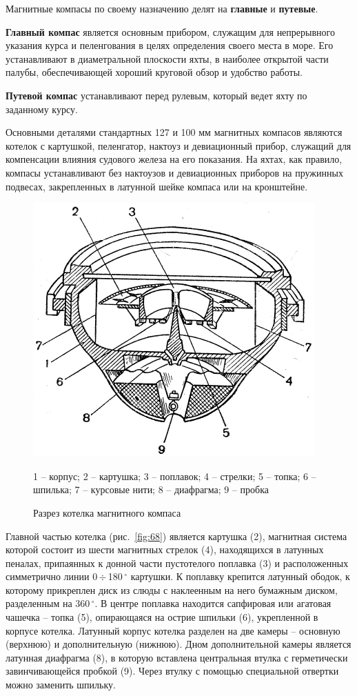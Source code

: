 \documentclass[a4paper, 12pt, twoside, final, book, russian, fittopage, cyremdash]{ncc}
\newcommand{\gr}{\ensuremath{\,^\circ}\xspace}
\newcommand{\otdo}{\,\ensuremath{\div}\,}
\newcommand{\ris}[1]{\ref{fig:#1}}
\begin{document}
Магнитные компасы по своему назначению делят на \textbf{главные} и \textbf{путевые}. 

\textbf{Главный компас} является основным прибором, служащим для непрерывного указания курса и пеленгования в целях определения своего места в море. Его устанавливают в диаметральной плоскости яхты, в наиболее открытой части палубы, обеспечивающей хороший круговой обзор и удобство работы. 

\textbf{Путевой компас} устанавливают перед рулевым, который ведет яхту по заданному курсу. 

Основными деталями стандартных 127 и 100 мм магнитных компасов являются котелок с картушкой, пеленгатор, нактоуз и девиационный прибор, служащий для компенсации влияния судового железа на его показания. На яхтах, как правило, компасы устанавливают без нактоузов и девиационных приборов на пружинных подвесах, закрепленных в латунной шейке компаса или на кронштейне. 

\begin{figure}[htb]
  \centering{}
  \includegraphics[scale=1.2]{0068P}
  \caption{Разрез котелка магнитного компаса}
  \label{fig:N68}
  \small
  \centering{}
  1 \--- корпус; 2 \--- картушка; 3 \--- поплавок; 4 \--- стрелки; 5 \--- топка; 6 \--- шпилька; 7 \--- курсовые нити; 8 \--- диафрагма; 9 \--- пробка
\end{figure} 

Главной частью котелка (рис.~\ris{68}) является картушка (2), магнитная система которой состоит из шести магнитных стрелок (4), находящихся в латунных пеналах, припаянных к донной части пустотелого поплавка (3) и расположенных симметрично линии 0\otdo 180\gr картушки. К поплавку крепится латунный ободок, к которому прикреплен диск из слюды с наклеенным на него бумажным диском, разделенным на 360\gr. В центре поплавка находится сапфировая или агатовая чашечка \--- топка (5), опирающаяся на острие шпильки (6), укрепленной в корпусе котелка. Латунный корпус котелка разделен на две камеры \--- основную (верхнюю) и дополнительную (нижнюю). Дном дополнительной камеры является латунная диафрагма (8), в которую вставлена центральная втулка с герметически завинчивающейся пробкой (9). Через втулку с помощью специальной отвертки можно заменить шпильку. 
\end{document}
